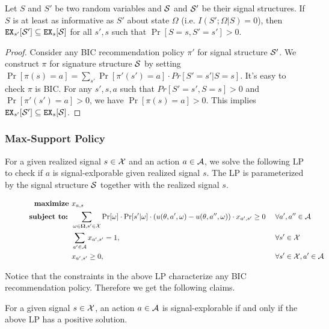 \begin{lemma}
\label{lem:infomono}
Let $S$ and $S'$ be two random variables and $\S$ and $\S'$ be their signal structures. If $S$ is at least as informative as $S'$ about state $\Omega$ (i.e. $I(S' ; \Omega|S) = 0$), then $\EX_{s'}[\S'] \subseteq \EX_s[\S]$ for all $s' ,s$ such that $\Pr[S= s, S'= s'] > 0$.
\end{lemma}

\begin{proof}
Consider any BIC recommendation policy $\pi'$ for signal structure $\S'$. We construct $\pi$ for signature structure $\S$ by setting $\Pr[\pi(s) = a] = \sum_{s'} \Pr[\pi'(s') = a] \cdot Pr[S' = s'|S = s]$. It's easy to check $\pi$ is BIC. For any $s', s ,a$ such that $Pr[S' = s',S = s] >0 $ and $\Pr[\pi'(s') = a] >0$, we have $\Pr[\pi(s) = a] > 0$. This implies $\EX_{s'}[\S'] \subseteq \EX_s[\S]$.
\end{proof}

\subsubsection{Max-Support Policy}
For a given realized signal $s \in \X$ and an action $a \in \A$, we solve the following LP to check if $a$ is signal-exlporable given realized signal $s$. The LP is parameterized by the signal structure $\S$ together with the realized signal $s$. 

\begin{figure}[H]
\begin{mdframed}
\begin{alignat*}{2}
  \textbf{maximize }   & x_{a,s}\  \\
  \textbf{subject to: } & \sum_{\omega \in \varOmega, s' \in \X} \Pr[\omega] \cdot \Pr[s' | \omega] \cdot \left(u(\theta, a', \omega) - u(\theta, a'', \omega)\right) \cdot x_{a',s'} \geq 0   &\ & \forall a',a'' \in \A \\
                       & \sum_{a'\in \A} x_{a',s'} = 1,  \ &\ & \forall s' \in \X \\
                       & x_{a',s'} \geq 0,  \ &\ & \forall s' \in \X, a'\in \A \\
\end{alignat*}
\end{mdframed}
\label{fig:public_lp}
\end{figure}

Notice that the constraints in the above LP characterize any BIC recommendation policy. Therefore we get the following claims.
\begin{claim}
For a given signal $s \in \X$, an action $a \in \A$ is signal-explorable if and only if the above LP has a positive solution. 
\end{claim}

